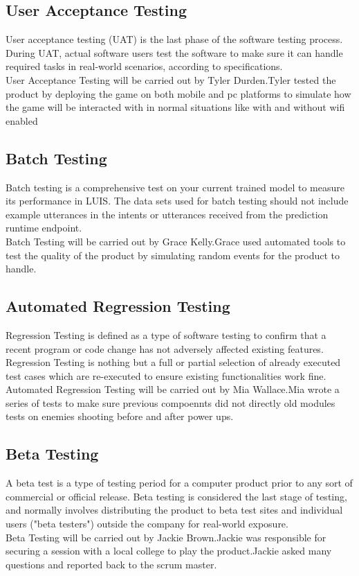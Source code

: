 \subsection{User Acceptance Testing}
User acceptance testing (UAT) is the last phase of the software testing process. During UAT, actual software users test the software to make sure it can handle required tasks in real-world scenarios, according to specifications.\\


User Acceptance Testing will be carried out by Tyler Durden.Tyler tested the product by deploying the game on both mobile and pc platforms to simulate how the game will be interacted with in normal situations like with and without wifi enabled


\subsection{Batch Testing}
Batch testing is a comprehensive test on your current trained model to measure its performance in LUIS. The data sets used for batch testing should not include example utterances in the intents or utterances received from the prediction runtime endpoint.\\



Batch Testing will be carried out by Grace Kelly.Grace used automated tools to test the quality of the product by simulating random events for the product to handle.



\subsection{Automated Regression Testing}
Regression Testing is defined as a type of software testing to confirm that a recent program or code change has not adversely affected existing features. Regression Testing is nothing but a full or partial selection of already executed test cases which are re-executed to ensure existing functionalities work fine.\\


Automated Regression Testing will be carried out by Mia Wallace.Mia wrote a series of tests to make sure previous compoennts did not directly old modules tests on enemies shooting before and after power ups.



\subsection{Beta Testing}
A beta test is a type of testing period for a computer product prior to any sort of commercial or official release. Beta testing is considered the last stage of testing, and normally involves distributing the product to beta test sites and individual users ("beta testers") outside the company for real-world exposure.\\

Beta Testing will be carried out by Jackie Brown.Jackie was responsible for securing a session with a local college to play the product.Jackie asked many questions and reported back to the scrum master.
